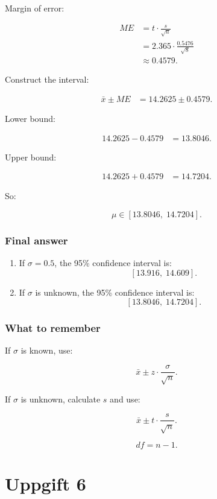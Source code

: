 \documentclass[10pt]{article}
\begin{document}
Margin of error:

\begin{align*}
ME
&=t\cdot \frac{s}{\sqrt{n}} \\[2mm]
&=2.365\cdot \frac{0.5476}{\sqrt{8}} \\[2mm]
&\approx 0.4579.
\end{align*}

Construct the interval:

\begin{align*}
\bar{x}\pm ME
&=14.2625\pm 0.4579.
\end{align*}

Lower bound:

\begin{align*}
14.2625-0.4579
&=13.8046.
\end{align*}

Upper bound:

\begin{align*}
14.2625+0.4579
&=14.7204.
\end{align*}

So:

\[
\mu\in [13.8046,\;14.7204].
\]

\subsubsection*{Final answer}
\begin{enumerate}[label=\alph*)]
\item If \(\sigma=0.5\), the 95\% confidence interval is:
\[
[13.916,\;14.609].
\]

\item If \(\sigma\) is unknown, the 95\% confidence interval is:
\[
[13.8046,\;14.7204].
\]
\end{enumerate}

\subsubsection*{What to remember}
If \(\sigma\) is known, use:

\[
\bar{x}\pm z\cdot \frac{\sigma}{\sqrt{n}}.
\]

If \(\sigma\) is unknown, calculate \(s\) and use:

\[
\bar{x}\pm t\cdot \frac{s}{\sqrt{n}}.
\]

\[
df=n-1.
\]

\section*{Uppgift 6}
\end{document}
